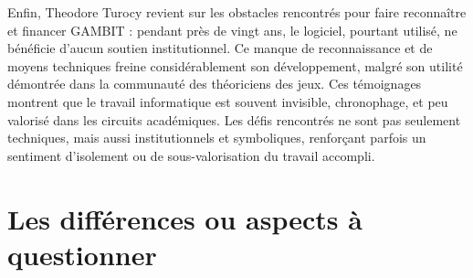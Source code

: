 Enfin, Theodore Turocy revient sur les obstacles rencontrés pour faire reconnaître et financer GAMBIT : pendant près de vingt ans, le logiciel, pourtant utilisé, ne bénéficie d’aucun soutien institutionnel. Ce manque de reconnaissance et de moyens techniques freine considérablement son développement, malgré son utilité démontrée dans la communauté des théoriciens des jeux. Ces témoignages montrent que le travail informatique est souvent invisible, chronophage, et peu valorisé dans les circuits académiques. Les défis rencontrés ne sont pas seulement techniques, mais aussi institutionnels et symboliques, renforçant parfois un sentiment d’isolement ou de sous-valorisation du travail accompli.


\section{Les différences ou aspects à questionner}

